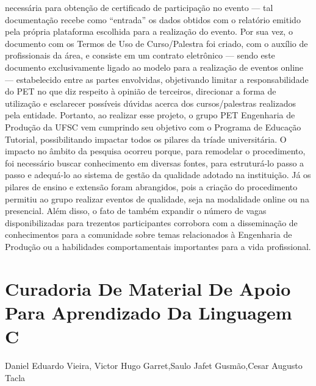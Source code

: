 necessária para obtenção de certificado de participação no evento — tal documentação recebe 
como “entrada” os dados obtidos com o relatório emitido pela própria plataforma escolhida para a 
realização do evento. Por sua vez, o documento com os Termos de Uso de Curso/Palestra foi 
criado, com o auxílio de profissionais da área, e consiste em um contrato eletrônico — sendo este 
documento exclusivamente ligado ao modelo para a realização de eventos online — estabelecido 
entre as partes envolvidas, objetivando limitar a responsabilidade do PET no que diz respeito à 
opinião de terceiros, direcionar a forma de utilização e esclarecer possíveis dúvidas acerca dos 
cursos/palestras realizados pela entidade.
Portanto, ao realizar esse projeto, o grupo PET Engenharia de Produção da UFSC vem cumprindo 
seu objetivo com o Programa de Educação Tutorial, possibilitando impactar todos os pilares da 
tríade universitária. O impacto no âmbito da pesquisa ocorreu porque, para remodelar o 
procedimento, foi necessário buscar conhecimento em diversas fontes, para estruturá-lo passo a 
passo e adequá-lo ao sistema de gestão da qualidade adotado na instituição. Já os pilares de ensino 
e extensão foram abrangidos, pois a criação do procedimento permitiu ao grupo realizar eventos 
de qualidade, seja na modalidade online ou na presencial. Além disso, o fato de também expandir 
o número de vagas disponibilizadas para trezentos participantes corrobora com a disseminação de 
conhecimentos para a comunidade sobre temas relacionados à Engenharia de Produção ou a 
habilidades comportamentais importantes para a vida profissional.




\section*{Curadoria De Material De Apoio Para Aprendizado Da Linguagem C}

Daniel Eduardo Vieira, Victor Hugo Garret,Saulo Jafet Gusmão,Cesar Augusto Tacla

